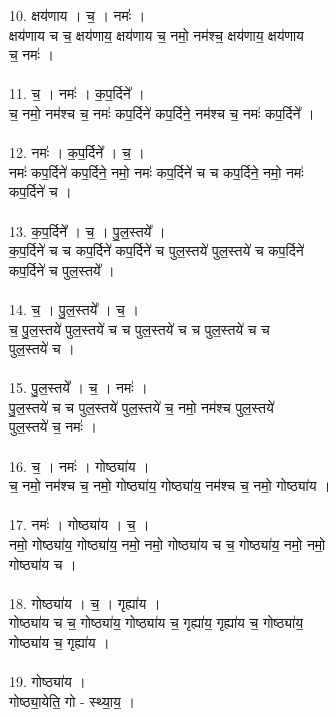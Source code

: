 10. क्षय॑णाय । च॒ । नमः॑ ।\\
क्षय॑णाय च च॒ क्षय॑णाय॒ क्षय॑णाय च॒ नमो॒ नम॑श्च॒ क्षय॑णाय॒ क्षय॑णाय\\
च॒ नमः॑ ।\\
\\
11. च॒ । नमः॑ । क॒प॒र्दिने᳚ ।\\
च॒ नमो॒ नम॑श्च च॒ नमः॑ कप॒र्दिने॑ कप॒र्दिने॒ नम॑श्च च॒ नमः॑ कप॒र्दिने᳚ ।\\
\\
12. नमः॑ । क॒प॒र्दिने᳚ । च॒ ।\\
नमः॑ कप॒र्दिने॑ कप॒र्दिने॒ नमो॒ नमः॑ कप॒र्दिने॑ च च कप॒र्दिने॒ नमो॒ नमः॑\\
कप॒र्दिने॑ च ।\\
\\
13. क॒प॒र्दिने᳚ । च॒ । पु॒ल॒स्तये᳚ ।\\
क॒प॒र्दिने॑ च च कप॒र्दिने॑ कप॒र्दिने॑ च पुल॒स्तये॑ पुल॒स्तये॑ च कप॒र्दिने॑\\
कप॒र्दिने॑ च पुल॒स्तये᳚ ।\\
\\
14. च॒ । पु॒ल॒स्तये᳚ । च॒ ।\\
च॒ पु॒ल॒स्तये॑ पुल॒स्तये॑ च च पुल॒स्तये॑ च च पुल॒स्तये॑ च च\\
पुल॒स्तये॑ च ।\\
\\
15. पु॒ल॒स्तये᳚ । च॒ । नमः॑ ।\\
पु॒ल॒स्तये॑ च च पुल॒स्तये॑ पुल॒स्तये॑ च॒ नमो॒ नम॑श्च पुल॒स्तये॑\\
पुल॒स्तये॑ च॒ नमः॑ ।\\
\\
16. च॒ । नमः॑ । गोष्ठ्या॑य ।\\
च॒ नमो॒ नम॑श्च च॒ नमो॒ गोष्ठ्या॑य॒ गोष्ठ्या॑य॒ नम॑श्च च॒ नमो॒ गोष्ठ्या॑य ।\\
\\
17. नमः॑ । गोष्ठ्या॑य । च॒ ।\\
नमो॒ गोष्ठ्या॑य॒ गोष्ठ्या॑य॒ नमो॒ नमो॒ गोष्ठ्या॑य च च॒ गोष्ठ्या॑य॒ नमो॒ नमो॒\\
गोष्ठ्या॑य च ।\\
\\
18. गोष्ठ्या॑य । च॒ । गृह्या॑य ।\\
गोष्ठ्या॑य च च॒ गोष्ठ्या॑य॒ गोष्ठ्या॑य च॒ गृह्या॑य॒ गृह्या॑य च॒ गोष्ठ्या॑य॒\\
गोष्ठ्या॑य च॒ गृह्या॑य ।\\
\\
19. गोष्ठ्या॑य ।\\
गोष्ठ्या॒येति॒ गो - स्थ्या॒य॒ ।\\
